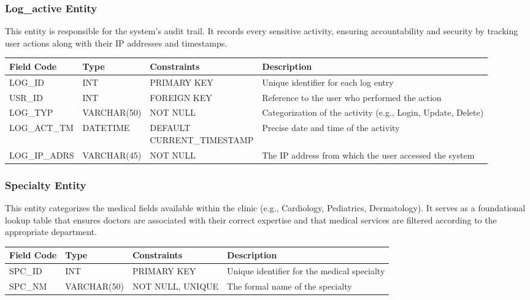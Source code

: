 \subsubsection{Log\_active Entity}
This entity is responsible for the system's audit trail. It records every sensitive activity, ensuring accountability and security by tracking user actions along with their IP addresses and timestamps.
\begin{table}[H]
	\centering
	\small
	\renewcommand{\arraystretch}{1.4}
	\begin{tabularx}{\textwidth}{l l l X}
		\toprule
		\rowcolor[gray]{0.9} \textbf{Field Code} & \textbf{Type} & \textbf{Constraints} & \textbf{Description} \\
		\midrule
		LOG\_ID & INT & PRIMARY KEY & Unique identifier for each log entry \\
		USR\_ID & INT & FOREIGN KEY & Reference to the user who performed the action \\
		LOG\_TYP & VARCHAR(50) & NOT NULL & Categorization of the activity (e.g., Login, Update, Delete) \\
		LOG\_ACT\_TM & DATETIME & \makecell[l]{DEFAULT \\ CURRENT\_TIMESTAMP} & Precise date and time of the activity \\
		LOG\_IP\_ADRS & VARCHAR(45) & NOT NULL & The IP address from which the user accessed the system \\
		\bottomrule
	\end{tabularx}
\end{table}
\subsubsection{Specialty Entity}
This entity categorizes the medical fields available within the clinic (e.g., Cardiology, Pediatrics, Dermatology). It serves as a foundational lookup table that ensures doctors are associated with their correct expertise and that medical services are filtered according to the appropriate department.
\begin{table}[H]
	\centering
	\small
	\renewcommand{\arraystretch}{1.4}
	\begin{tabularx}{\textwidth}{l l l X}
		\toprule
		\rowcolor[gray]{0.9} \textbf{Field Code} & \textbf{Type} & \textbf{Constraints} & \textbf{Description} \\
		\midrule
		SPC\_ID & INT & PRIMARY KEY & Unique identifier for the medical specialty \\
		SPC\_NM & VARCHAR(50) & NOT NULL, UNIQUE & The formal name of the specialty \\
		\bottomrule
	\end{tabularx}
\end{table}
